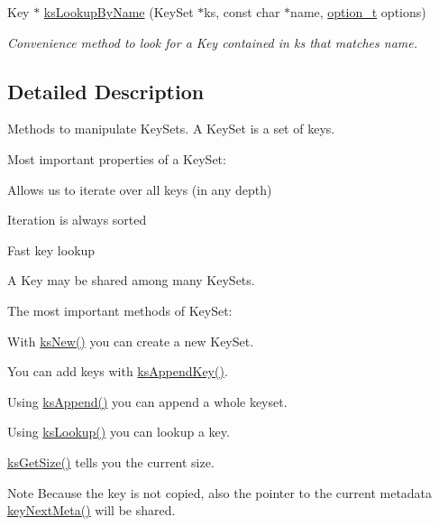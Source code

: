 \begin{DoxyCompactItemize}
Key $\ast$ \hyperlink{group__keyset_gad2e30fb6d4739d917c5abb2ac2f9c1a1}{ks\-Lookup\-By\-Name} (Key\-Set $\ast$ks, const char $\ast$name, \hyperlink{group__keyset_ga98a3d6a4016c9dad9cbd1a99a9c2a45a}{option\-\_\-t} options)
\begin{DoxyCompactList}\small\item\em Convenience method to look for a Key contained in {\ttfamily ks} that matches {\ttfamily name}. \end{DoxyCompactList}\end{DoxyCompactItemize}


\subsection{Detailed Description}
Methods to manipulate Key\-Sets. A Key\-Set is a set of keys.

Most important properties of a Key\-Set\-:


\begin{DoxyItemize}
\item Allows us to iterate over all keys (in any depth)
\item Iteration is always sorted
\item Fast key lookup
\item A Key may be shared among many Key\-Sets.
\end{DoxyItemize}

The most important methods of Key\-Set\-:


\begin{DoxyItemize}
\item With \hyperlink{group__keyset_ga671e1aaee3ae9dc13b4834a4ddbd2c3c}{ks\-New()} you can create a new Key\-Set.
\item You can add keys with \hyperlink{group__keyset_gaa5a1d467a4d71041edce68ea7748ce45}{ks\-Append\-Key()}.
\item Using \hyperlink{group__keyset_ga21eb9c3a14a604ee3a8bdc779232e7b7}{ks\-Append()} you can append a whole keyset.
\item Using \hyperlink{group__keyset_gaa34fc43a081e6b01e4120daa6c112004}{ks\-Lookup()} you can lookup a key.
\item \hyperlink{group__keyset_ga7474ad6b0a0fa969dbdf267ba5770eee}{ks\-Get\-Size()} tells you the current size.
\end{DoxyItemize}

\begin{DoxyNote}{Note}
Because the key is not copied, also the pointer to the current metadata \hyperlink{group__keymeta_ga4c88342f580a4291455a801af71ce048}{key\-Next\-Meta()} will be shared. 
\end{DoxyNote}


